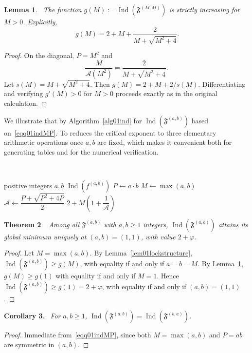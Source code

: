 \documentclass[12pt]{amsart}
\theoremstyle{plain}
\newtheorem{theorem}{Theorem}[section]
\newtheorem{lemma}[theorem]{Lemma}
\newtheorem{corollary}[theorem]{Corollary}
\theoremstyle{definition}
\theoremstyle{remark}
\newcommand{\AlphA}{\mathcal{A}}
\newcommand{\FD}{\mathfrak{F}}
\begin{document}
\begin{lemma}~\label{lem03diagonalincreasing}
The function $g(M):=\operatorname{Ind}(\FD^{(M,M)})$ is strictly increasing for $M>0$. Explicitly,
\begin{equation}~\label{eqq1lem03diagonalincreasing}
g(M) = 2+M+\dfrac{2}{M+\sqrt{M^2+4}}.
\end{equation}
\end{lemma}
\begin{proof}
On the diagonal, $P=M^2$ and
\[
  \frac{M}{\AlphA (M^2)} = \frac{2}{M+\sqrt{M^2+4}}.
\]
Let $s(M)=M+\sqrt{M^2+4}$. Then $g(M)=2+M+2/s(M)$. Differentiating and verifying $g'(M)>0$ for $M>0$ proceeds exactly as in the original calculation.
\end{proof}
We illustrate that by Algorithm~\ref{alg01ind} for $\operatorname{Ind}(\FD^{(a,b)})$ based on~\eqref{eqq01indMP}.  To reduces the critical exponent to three elementary arithmetic operations once $a,b$ are fixed, which makes it convenient both for generating tables and for the numerical verification.
\begin{algorithm}[H]
\small
\caption{Compute $\operatorname{Ind}(\FD^{(a,b)})$}~\label{alg01ind}
\begin{algorithmic}[1]
\Require positive integers $a,b$
\Ensure $\operatorname{Ind}(f^{(a,b)})$
\State $P \gets a\cdot b$
\State $M \gets \max(a,b)$
\State $\AlphA \gets \dfrac{P+\sqrt{P^2+4P}}{2}$
\State \Return $2 + M\left(1+\dfrac{1}{\AlphA}\right)$
\end{algorithmic}
\end{algorithm}

\begin{theorem}~\label{thm01globalmin}
Among all $\FD^{(a,b)}$ with $a,b\geqslant 1$ integers,
$\operatorname{Ind}(\FD^{(a,b)})$ attains its global minimum uniquely at
$(a,b)=(1,1)$, with value $2+\varphi$.
\end{theorem}
\begin{proof}
Let $M=\max(a,b)$. By Lemma~\ref{lem01lockstructure},
$\operatorname{Ind}(\FD^{(a,b)}) \geqslant g(M)$, with equality if and only if $a=b=M$. By Lemma~\ref{lem03diagonalincreasing}, $g(M)\geqslant g(1)$ with equality if and only if $M=1$. Hence $\operatorname{Ind}(\FD^{(a,b)})\geqslant g(1)=2+\varphi$, with equality if and only if $(a,b)=(1,1)$.
\end{proof}

\begin{corollary}~\label{cor01symmetry}
For $a,b\geqslant 1$, $\operatorname{Ind}(\FD^{(a,b)})=\operatorname{Ind}(\FD^{(b,a)})$.
\end{corollary}
\begin{proof}
Immediate from~\eqref{eqq01indMP}, since both $M=\max(a,b)$ and $P=ab$ are symmetric in $(a,b)$.
\end{proof}
\end{document}
